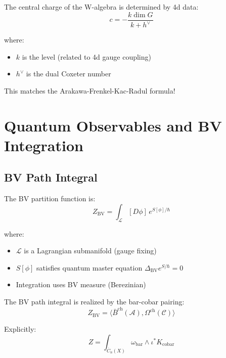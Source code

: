 \begin{theorem}
The central charge of the W-algebra is determined by 4d data:
$$c = -\frac{k \dim G}{k + h^\vee}$$

where:
\begin{itemize}
\item $k$ is the level (related to 4d gauge coupling)
\item $h^\vee$ is the dual Coxeter number
\end{itemize}

This matches the Arakawa-Frenkel-Kac-Radul formula!
\end{theorem}

\section{Quantum Observables and BV Integration}

\subsection{BV Path Integral}

\begin{definition}
The BV partition function is:
$$Z_{\text{BV}} = \int_{\mathcal{L}} [D\phi] \, e^{S[\phi]/\hbar}$$

where:
\begin{itemize}
\item $\mathcal{L}$ is a Lagrangian submanifold (gauge fixing)
\item $S[\phi]$ satisfies quantum master equation $\Delta_{\text{BV}} e^{S/\hbar} = 0$
\item Integration uses BV measure (Berezinian)
\end{itemize}
\end{definition}

\begin{theorem}[BV Integration = Bar-Cobar Pairing]
The BV path integral is realized by the bar-cobar pairing:
$$Z_{\text{BV}} = \langle \bar{B}^{\text{ch}}(\mathcal{A}), 
\Omega^{\text{ch}}(\mathcal{C}) \rangle$$

Explicitly:
$$Z = \int_{\overline{C}_n(X)} \omega_{\text{bar}} \wedge \iota^* K_{\text{cobar}}$$
\end{theorem}

